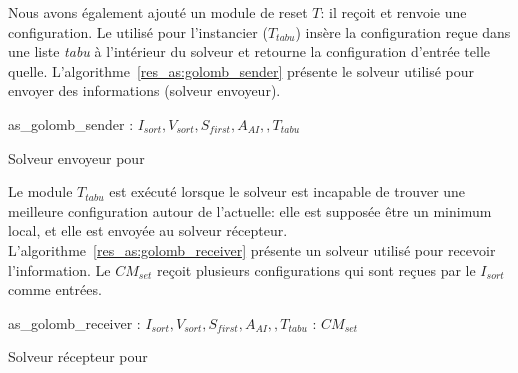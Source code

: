 Nous avons également ajouté un module de reset $T$: il reçoit et renvoie une configuration. Le \om{} utilisé pour l'instancier ($T_{tabu}$) insère la configuration reçue dans une liste \textit{tabu} à l'intérieur du solveur et retourne la configuration d'entrée telle quelle. L'algorithme~\ref{res_as:golomb_sender} présente le solveur utilisé pour envoyer des informations (solveur envoyeur).

\begin{algorithm}
\dontprintsemicolon
\SetNoline
{}
   as\_golomb\_sender\;
\algoindent{} : $I_{sort}, V_{sort}, S_{first}, A_{AI}, , T_{tabu}$ \; 
\caption{Solveur envoyeur pour  \GRP}\label{res_as:golomb_sender}
\end{algorithm}

Le module $T_{tabu}$ est exécuté lorsque le solveur est incapable de trouver une meilleure configuration autour de l'actuelle: elle est supposée être un minimum local, et elle est envoyée au solveur récepteur. L'algorithme~\ref{res_as:golomb_receiver} présente un solveur utilisé pour recevoir l'information. Le \opch{} $CM_{set}$ reçoit plusieurs configurations qui sont reçues par le \om{} $I_{sort}$ comme entrées.
 
\begin{algorithm}
\dontprintsemicolon
\SetNoline
{}
   as\_golomb\_receiver\;
\algoindent{} : $I_{sort}, V_{sort}, S_{first}, A_{AI}, , T_{tabu}$ \; 
\algoindent{}: $CM_{set}$\;
\caption{Solveur récepteur pour \GRP}\label{res_as:golomb_receiver}
\end{algorithm}

